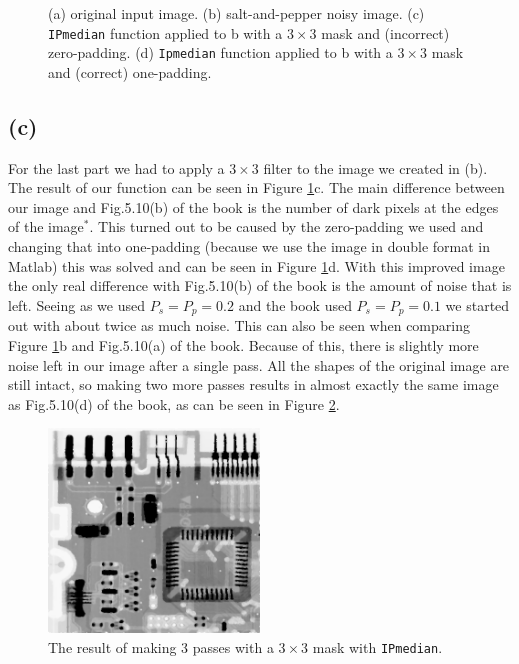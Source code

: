 \documentclass{article}
\begin{document}
\begin{figure}[ht]
    \centering
    
    \caption{(a) original input image. (b) salt-and-pepper noisy image. (c) \texttt{IPmedian} function applied to b with a $3 \times 3$ mask and (incorrect) zero-padding. (d) \texttt{Ipmedian} function applied to b with a $3 \times 3$ mask and (correct) one-padding.}
    \label{fig:IPmedian}
\end{figure}

\subsection*{(c)}
For the last part we had to apply a $3 \times 3$ filter to the image we created in (b). The result of our function can be seen in Figure \ref{fig:IPmedian}c. The main difference between our image and Fig.5.10(b) of the book is the number of dark pixels at the edges of the image$^*$. This turned out to be caused by the zero-padding we used and changing that into one-padding (because we use the image in double format in Matlab) this was solved and can be seen in Figure \ref{fig:IPmedian}d. With this improved image the only real difference with Fig.5.10(b) of the book is the amount of noise that is left. Seeing as we used $P_s = P_p = 0.2$ and the book used $P_s = P_p = 0.1$ we started out with about twice as much noise. This can also be seen when comparing Figure \ref{fig:IPmedian}b and Fig.5.10(a) of the book. Because of this, there is slightly more noise left in our image after a single pass. All the shapes of the original image are still intact, so making two more passes results in almost exactly the same image as Fig.5.10(d) of the book, as can be seen in Figure \ref{fig:IPmedian3pass}.

\begin{figure}[ht]
    \centering
    \includegraphics[width=0.5\textwidth]{Assignment_2/output_plots/multipassFilteredImage.png}
    \caption{The result of making 3 passes with a $3 \times 3$ mask with \texttt{IPmedian}.}
    \label{fig:IPmedian3pass}
\end{figure}
\end{document}
